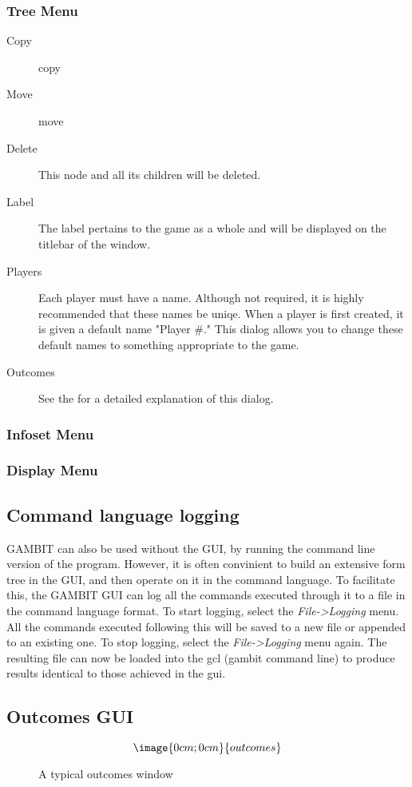 \subsubsection{Tree Menu}
\begin{description}
\item[Copy] copy
\item[Move] move
\item[Delete]  This node and all its children will be deleted.
\item[Label]  The label pertains to the game as a whole and will be
displayed on the titlebar of the window.
\item[Players]  Each player must have a name.  Although not required, it
is highly recommended that these names be uniqe.  When a player is first
created, it is given a default name "Player \#."  This dialog allows you to
change these default names to something appropriate to the game.
\item[Outcomes]  See the 
for a detailed explanation of this dialog.
\end{description}

\subsubsection{Infoset Menu}

\subsubsection{Display Menu}

\subsection{Command language logging}
GAMBIT can also be used without the GUI, by running the command line
version of the program.  However, it is often convinient to build an
extensive form tree in the GUI, and then operate on it in the command
language.  To facilitate this, the GAMBIT GUI can log all the commands
executed through it to a file in the command language format.  To start
logging, select the {\em File->Logging} menu.  All the commands executed
following this will be saved to a new file or appended to an existing one.
To stop logging, select the {\em File->Logging} menu again.  The resulting
file can now be loaded into the gcl (gambit command line) to produce
results identical to those achieved in the gui.


\subsection{Outcomes GUI}\label{OutcomesGUI}
\begin{figure}
$$\image{0cm;0cm}{outcomes}$$
\caption{A typical outcomes window}\label{fig:outcomes}
\end{figure}

